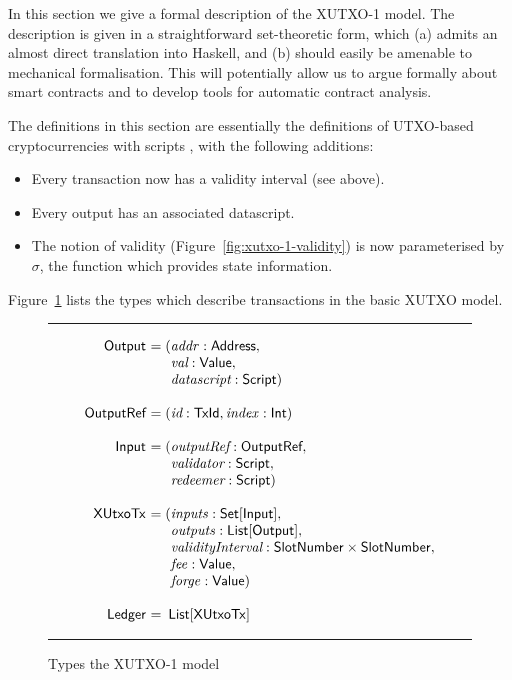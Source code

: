 \documentclass[a4paper]{article}
\renewcommand{\i}{\textit}  %
\newcommand{\s}{\textsf}  %
\theoremstyle{definition}  %
\newenvironment{arraydefs}[1]{\setlength{\arraycolsep}{0pt}\begin{array}{#1}}{\end{array}}
\newcommand\rfskip{7pt}
\newenvironment{ruledfigure}[1]{\begin{figure}[#1]\hrule\vspace{\rfskip}}{\vspace{\rfskip}\hrule\end{figure}}
\newcommand{\List}[1]{\ensuremath{\s{List}[#1]}}
\newcommand{\Set}[1]{\ensuremath{\s{Set}[#1]}}
\newcommand{\mi}[1]{\ensuremath{\mathit{#1}}}
\newcommand{\idx}{\mi{index}}
\newcommand{\inputs}{\mi{inputs}}
\newcommand{\outputs}{\mi{outputs}}
\newcommand{\forge}{\mi{forge}}
\newcommand{\fee}{\mi{fee}}
\newcommand{\addr}{\mi{addr}}
\newcommand{\msf}[1]{\ensuremath{\mathsf{#1}}}
\newcommand{\slotnum}{\msf{SlotNumber}}
\newcommand{\xutxotx}{\msf{XUtxoTx}}
\newcommand{\valuetype}{\ensuremath{\s{Value}}}
\begin{document}
In this section we give a formal description of the XUTXO-1 model.  The
description is given in a straightforward set-theoretic form, which
(a) admits an almost direct translation into Haskell, and (b) should
easily be amenable to mechanical formalisation.  This will potentially
allow us to argue formally about smart contracts and to develop tools
for automatic contract analysis.

The definitions in this section are essentially the definitions of
UTXO-based cryptocurrencies with scripts \cite{Zahnentferner18-UTxO},
with the following additions:
\begin{itemize}
\item Every transaction now has a validity interval (see above).
\item Every output has an associated datascript.
\item The notion of validity (Figure~\ref{fig:xutxo-1-validity}) is now
  parameterised by $\sigma$, the function which provides state
  information.
\end{itemize}

\noindent Figure~\ref{fig:xutxo-1-types} lists the types which
describe transactions in the basic XUTXO model.


\begin{ruledfigure}{H}
  \[
  \begin{arraydefs}{rll}
    
    \s{Output } &= (&\addr: \s{Address},\\
    && \i{val}: \valuetype,\\
    &&  \i{datascript}: \s{Script})\\
    \\
    \s{OutputRef } &= (&\i{id}: \s{TxId}, \idx: \s{Int})\\
    \\
    \s{Input } & = (&\i{outputRef}: \s{OutputRef},\\
                 && \i{validator}: \s{Script},\\
                 && \i{redeemer}: \s{Script})\\
     \\
     \xutxotx\s{ } &= (&\inputs: \Set{\s{Input}},\\
     &&\outputs: \List{\s{Output}},\\
     &&\i{validityInterval}: \slotnum \times \slotnum,\\
     && \fee: \valuetype,\\
     &&\forge: \valuetype) \\
     \\
     \s{Ledger } &=&\!\List{\xutxotx}\\
  \end{arraydefs}
  \]
  \caption{Types the XUTXO-1 model}
  \label{fig:xutxo-1-types}
\end{ruledfigure}
\end{document}
